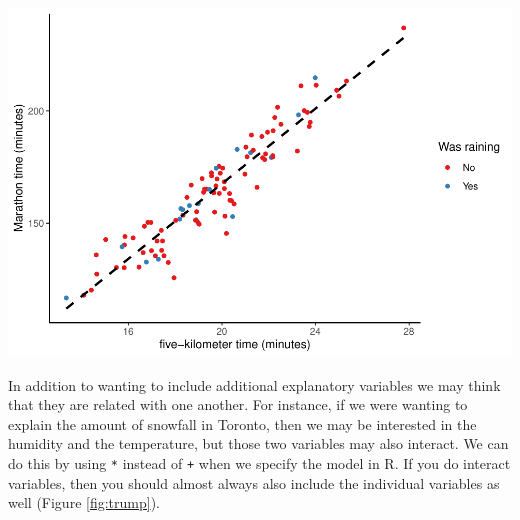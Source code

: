 \documentclass[
]{book}
\newenvironment{Shaded}{\begin{snugshade}}{\end{snugshade}}
\newcommand{\DataTypeTok}[1]{\textcolor[rgb]{0.13,0.29,0.53}{#1}}
\newcommand{\KeywordTok}[1]{\textcolor[rgb]{0.13,0.29,0.53}{\textbf{#1}}}
\newcommand{\NormalTok}[1]{#1}
\newcommand{\OperatorTok}[1]{\textcolor[rgb]{0.81,0.36,0.00}{\textbf{#1}}}
\newcommand{\OtherTok}[1]{\textcolor[rgb]{0.56,0.35,0.01}{#1}}
\newcommand{\StringTok}[1]{\textcolor[rgb]{0.31,0.60,0.02}{#1}}
\begin{document}
\begin{Shaded}
\end{Shaded}

\includegraphics{telling_stories_with_data_files/figure-latex/unnamed-chunk-360-1.pdf}

In addition to wanting to include additional explanatory variables we may think that they are related with one another. For instance, if we were wanting to explain the amount of snowfall in Toronto, then we may be interested in the humidity and the temperature, but those two variables may also interact. We can do this by using \texttt{*} instead of \texttt{+} when we specify the model in R. If you do interact variables, then you should almost always also include the individual variables as well (Figure \ref{fig:trump}).
\end{document}
